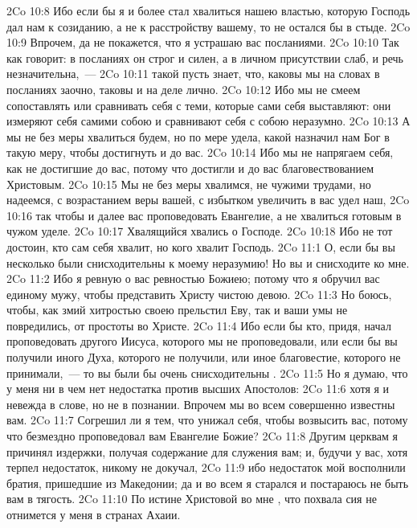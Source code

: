 \vs 2Co 10:8 Ибо если бы я и более стал хвалиться нашею властью, которую Господь дал нам к созиданию, а не к расстройству вашему, то не остался бы в стыде.
\vs 2Co 10:9 Впрочем, да не покажется, что я устрашаю вас  посланиями.
\vs 2Co 10:10 Так как  говорит: в посланиях он строг и силен, а в личном присутствии слаб, и речь  незначительна,~---
\vs 2Co 10:11 такой пусть знает, что, каковы мы на словах в посланиях заочно, таковы и на деле лично.
\vs 2Co 10:12 Ибо мы не смеем сопоставлять или сравнивать себя с теми, которые сами себя выставляют: они измеряют себя самими собою и сравнивают себя с собою неразумно.
\vs 2Co 10:13 А мы не без меры хвалиться будем, но по мере удела, какой назначил нам Бог в такую меру, чтобы достигнуть и до вас.
\vs 2Co 10:14 Ибо мы не напрягаем себя, как не достигшие до вас, потому что достигли и до вас благовествованием Христовым.
\vs 2Co 10:15 Мы не без меры хвалимся, не чужими трудами, но надеемся, с возрастанием веры вашей, с избытком увеличить в вас удел наш,
\vs 2Co 10:16 так чтобы и далее вас проповедовать Евангелие, а не хвалиться готовым в чужом уделе.
\vs 2Co 10:17 Хвалящийся хвались о Господе.
\vs 2Co 10:18 Ибо не тот достоин, кто сам себя хвалит, но кого хвалит Господь.
\vs 2Co 11:1 О, если бы вы несколько были снисходительны к моему неразумию! Но вы и снисходите ко мне.
\vs 2Co 11:2 Ибо я ревную о вас ревностью Божиею; потому что я обручил вас единому мужу, чтобы представить Христу чистою девою.
\vs 2Co 11:3 Но боюсь, чтобы, как змий хитростью своею прельстил Еву, так и ваши умы не повредились,  от простоты во Христе.
\vs 2Co 11:4 Ибо если бы кто, придя, начал проповедовать другого Иисуса, которого мы не проповедовали, или если бы вы получили иного Духа, которого не получили, или иное благовестие, которого не принимали,~--- то вы были бы очень снисходительны .
\vs 2Co 11:5 Но я думаю, что у меня ни в чем нет недостатка против высших Апостолов:
\vs 2Co 11:6 хотя я и невежда в слове, но не в познании. Впрочем мы во всем совершенно известны вам.
\vs 2Co 11:7 Согрешил ли я тем, что унижал себя, чтобы возвысить вас, потому что безмездно проповедовал вам Евангелие Божие?
\vs 2Co 11:8 Другим церквам я причинял издержки, получая  содержание для служения вам; и, будучи у вас, хотя терпел недостаток, никому не докучал,
\vs 2Co 11:9 ибо недостаток мой восполнили братия, пришедшие из Македонии; да и во всем я старался и постараюсь не быть вам в тягость.
\vs 2Co 11:10 По истине Христовой во мне , что похвала сия не отнимется у меня в странах Ахаии.
